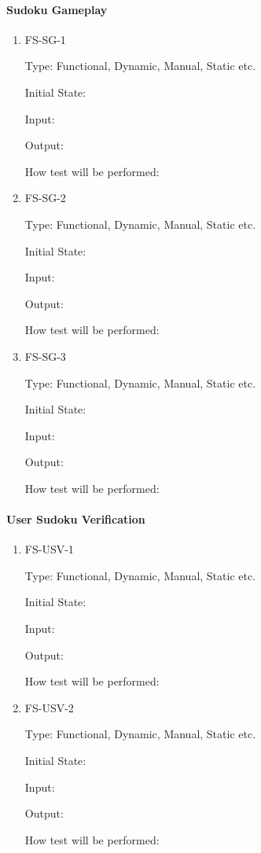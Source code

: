 \documentclass[11pt]{article}
\begin{document}
\paragraph{Sudoku Gameplay}

\begin{enumerate}

\item{FS-SG-1\\}

Type: Functional, Dynamic, Manual, Static etc.
					
Initial State: 
					
Input: 
					
Output: 
					
How test will be performed: 
					
\item{FS-SG-2\\}

Type: Functional, Dynamic, Manual, Static etc.
					
Initial State: 
					
Input: 
					
Output: 
					
How test will be performed: 

\item{FS-SG-3\\}

Type: Functional, Dynamic, Manual, Static etc.
					
Initial State: 
					
Input: 
					
Output: 
					
How test will be performed: 

\end{enumerate}

\paragraph{User Sudoku Verification}

\begin{enumerate}

\item{FS-USV-1\\}

Type: Functional, Dynamic, Manual, Static etc.
					
Initial State: 
					
Input: 
					
Output: 
					
How test will be performed: 
					
\item{FS-USV-2\\}

Type: Functional, Dynamic, Manual, Static etc.
					
Initial State: 
					
Input: 
					
Output: 
					
How test will be performed: 

\end{enumerate}
\end{document}
